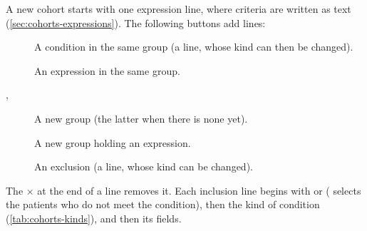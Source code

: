 A new cohort starts with one expression line, where criteria are written as text
(\cref{sec:cohorts-expressions}). The following buttons add lines:
\begin{description}
\item[] A condition in the same group (a  line, whose kind
  can then be changed).
\item[] An expression in the same group.
\item[, ] A new group (the latter when there is
  none yet).
\item[] A new group holding an expression.
\item[] An exclusion (a  line, whose kind can be changed).
\end{description}
The $\times$ at the end of a line removes it. Each inclusion line begins with  or
 ( selects the patients who do not meet the condition), then the kind of
condition (\cref{tab:cohorts-kinds}), and then its fields.

